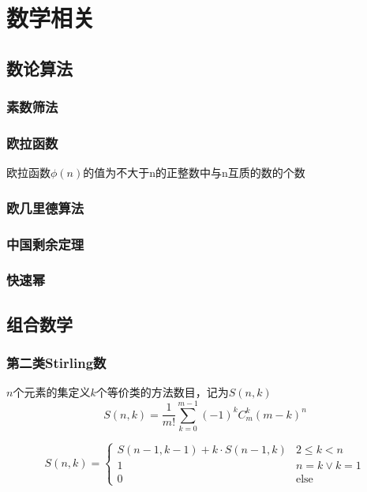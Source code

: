 
\section{数学相关}

\subsection{数论算法}
\subsubsection{素数筛法}
\subsubsection{欧拉函数}
欧拉函数$\phi(n)$的值为不大于n的正整数中与n互质的数的个数
\subsubsection{欧几里德算法}
\subsubsection{中国剩余定理}
\subsubsection{快速幂}

\subsection{组合数学}
\subsubsection{第二类Stirling数}
$n$个元素的集定义$k$个等价类的方法数目，记为$S(n,k)$
\begin{displaymath}
S(n, k) = \frac{1}{m!}\sum_{k=0}^{m-1}{(-1)^k C_m^k (m-k)^n}
\end{displaymath}

\begin{displaymath}
S(n, k) = 
\begin{cases}
S(n-1, k-1) + k\cdot S(n-1, k) & 2\leqslant k < n\\
1 & n=k \vee k=1 \\
0 & \text{else}
\end{cases}
\end{displaymath}
$$ $$

